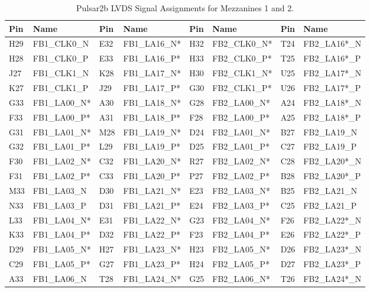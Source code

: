 \documentclass[letterpaper]{article}
\begin{document}
\begin{table}[htp]
\centering
\caption{Pulsar2b LVDS Signal Assignments for Mezzanines 1 and 2.}
\begin{tabular}{|l|l|l|l||l|l|l|l|} \hline
Pin & Name & Pin & Name & Pin & Name & Pin & Name \\ \hline \hline
H29 & FB1\_CLK0\_N & E32 & FB1\_LA16\_N* & H32 & FB2\_CLK0\_N* & T24 & FB2\_LA16*\_N\\ \hline
H28 & FB1\_CLK0\_P & E33 & FB1\_LA16\_P* & H33 & FB2\_CLK0\_P* & T25 & FB2\_LA16*\_P\\ \hline
J27 & FB1\_CLK1\_N & K28 & FB1\_LA17\_N* & H30 & FB2\_CLK1\_N* & U25 & FB2\_LA17*\_N\\ \hline
K27 & FB1\_CLK1\_P & J29 & FB1\_LA17\_P* & G30 & FB2\_CLK1\_P* & U26 & FB2\_LA17*\_P\\ \hline
G33 & FB1\_LA00\_N* & A30 & FB1\_LA18\_N* & G28 & FB2\_LA00\_N* & A24 & FB2\_LA18*\_N\\ \hline
F33 & FB1\_LA00\_P* & A31 & FB1\_LA18\_P* & F28 & FB2\_LA00\_P* & A25 & FB2\_LA18*\_P\\ \hline
G31 & FB1\_LA01\_N* & M28 & FB1\_LA19\_N* & D24 & FB2\_LA01\_N* & B27 & FB2\_LA19\_N\\ \hline
G32 & FB1\_LA01\_P* & L29 & FB1\_LA19\_P* & D25 & FB2\_LA01\_P* & C27 & FB2\_LA19\_P\\ \hline
F30 & FB1\_LA02\_N* & C32 & FB1\_LA20\_N* & R27 & FB2\_LA02\_N* & C28 & FB2\_LA20*\_N\\ \hline
F31 & FB1\_LA02\_P* & C33 & FB1\_LA20\_P* & P27 & FB2\_LA02\_P* & B28 & FB2\_LA20*\_P\\ \hline
M33 & FB1\_LA03\_N & D30 & FB1\_LA21\_N* & E23 & FB2\_LA03\_N* & B25 & FB2\_LA21\_N\\ \hline
N33 & FB1\_LA03\_P & D31 & FB1\_LA21\_P* & E24 & FB2\_LA03\_P* & C25 & FB2\_LA21\_P\\ \hline
L33 & FB1\_LA04\_N* & E31 & FB1\_LA22\_N* & G23 & FB2\_LA04\_N* & F26 & FB2\_LA22*\_N\\ \hline
K33 & FB1\_LA04\_P* & D32 & FB1\_LA22\_P* & F23 & FB2\_LA04\_P* & E26 & FB2\_LA22*\_P\\ \hline
D29 & FB1\_LA05\_N* & H27 & FB1\_LA23\_N* & H23 & FB2\_LA05\_N* & D26 & FB2\_LA23*\_N\\ \hline
C29 & FB1\_LA05\_P* & G27 & FB1\_LA23\_P* & H24 & FB2\_LA05\_P* & D27 & FB2\_LA23*\_P\\ \hline
A33 & FB1\_LA06\_N & T28 & FB1\_LA24\_N* & G25 & FB2\_LA06\_N* & T26 & FB2\_LA24*\_N\\ \hline

\end{tabular}
\end{table}
\end{document}
